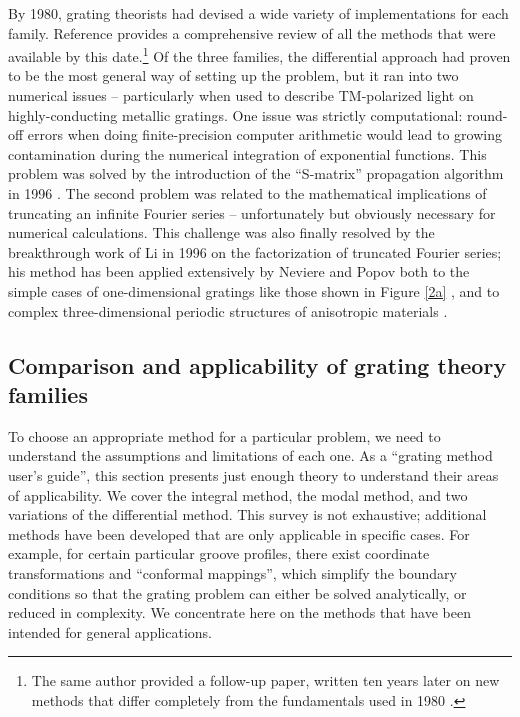 By 1980, grating theorists had devised a wide variety of implementations for each family.  %
Reference \cite{Pet80} provides a comprehensive review of all the methods that were available by this date.\footnote{The same author provided a follow-up paper, written ten years later on new methods that differ completely from the fundamentals used in 1980 \cite{Pet90}.}  Of the three families, the differential approach had proven to be the most general way of setting up the problem, but it ran into two numerical issues -- particularly when used to describe TM-polarized light on highly-conducting metallic gratings.  One issue was strictly computational: round-off errors when doing finite-precision computer arithmetic would lead to growing contamination during the numerical integration of exponential functions.  This problem was solved by the introduction of the ``S-matrix'' propagation algorithm in 1996 \cite{Li96,Mon98}.  The second problem was related to the mathematical implications of truncating an infinite Fourier series -- unfortunately but obviously necessary for numerical calculations.  This challenge was also finally resolved by the breakthrough work of Li \cite{Li96b} in 1996 on the factorization of truncated Fourier series; his method has been applied extensively by Neviere and Popov both to the simple cases of one-dimensional gratings like those shown in Figure \ref{2a} \cite{Pop01}, and to complex three-dimensional periodic structures of anisotropic materials \cite{Pop00,Nev02}.

\subsection{Comparison and applicability of grating theory families}
\label{methodComparison}
To choose an appropriate method for a particular problem, we need to understand the assumptions and limitations of each one.  As a ``grating method user's guide'', this section presents just enough theory to understand their areas of applicability.  We cover the integral method, the modal method, and two variations of the differential method.  This survey is not exhaustive; additional methods have been developed that are only applicable in specific cases.  For example, for certain particular groove profiles, there exist coordinate transformations and ``conformal mappings'', which simplify the boundary conditions so that the grating problem can either be solved analytically, or reduced in complexity.  We concentrate here on the methods that have been intended for general applications.
